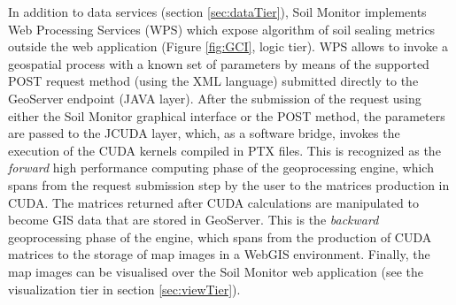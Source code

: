 \documentclass[APA,LATO1COL,doublespace]{WileyNJD-v2}
\newcommand{\toberevised}[1]{\emph{\textcolor{red}{#1}}} %
\begin{document}
In addition to data services (section \ref{sec:dataTier}), Soil Monitor implements Web Processing Services (WPS) which expose algorithm of soil sealing metrics outside the web application (Figure \ref{fig:GCI}, logic tier). 
WPS allows to invoke a geospatial process with a known set of parameters by means of the supported POST request method (using the XML language) submitted directly to the GeoServer endpoint (JAVA layer).
After the submission of the request using either the Soil Monitor graphical interface or the POST method, the parameters are passed to the JCUDA layer, which, as a software bridge, invokes the execution of the CUDA kernels compiled in PTX files.
This is recognized as the \textit{forward} high performance computing phase of the geoprocessing engine, which spans from the request submission step by the user to the matrices production in CUDA.
The matrices returned after CUDA calculations are manipulated to become GIS data that are stored in GeoServer.
This is the \textit{backward} geoprocessing phase of the engine, which spans from the production of CUDA matrices to the storage of map images in a WebGIS environment.
Finally, the map images can be visualised over the Soil Monitor web application (see the visualization tier in section \ref{sec:viewTier}).

\end{document}
